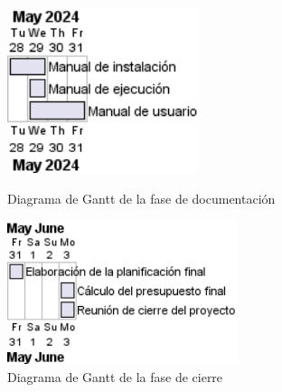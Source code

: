 \begin{figure}[H]
	\centering
	\begin{minipage}{0.45\textwidth}
		\includegraphics[width=0.5\textwidth]{4-PlanificacionYGestionDelTFG/PlanificacionFinal/gantt/gant-documentacion.png}
		\caption{Diagrama de Gantt de la fase de documentación}
	\end{minipage}
	\hfill
	\begin{minipage}{0.45\textwidth}
		\includegraphics[width=0.6\textwidth]{4-PlanificacionYGestionDelTFG/PlanificacionFinal/gantt/gant-cierre.png}
		\caption{Diagrama de Gantt de la fase de cierre}
	\end{minipage}
\end{figure}
